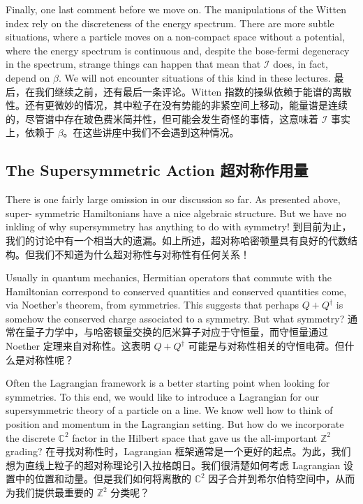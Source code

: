 \documentclass{article}
\newcommand{\SakuraiYukiko}{\emoji{cherry-blossom}\emoji{snowflake}}
\begin{document}
Finally, one last comment before we move on. The manipulations of the Witten index rely on the discreteness of the energy spectrum. There are more subtle situations, where a particle moves on a non-compact space without a potential, where the energy spectrum is continuous and, despite the bose-fermi degeneracy in the spectrum, strange things can happen that mean that $\mathcal{I}$ does, in fact, depend on $\beta$. We will not encounter situations of this kind in these lectures.
最后，在我们继续之前，还有最后一条评论。Witten 指数的操纵依赖于能谱的离散性。还有更微妙的情况，其中粒子在没有势能的非紧空间上移动，能量谱是连续的，尽管谱中存在玻色费米简并性，但可能会发生奇怪的事情，这意味着 $\mathcal{I}$ 事实上，依赖于 $\beta$。在这些讲座中我们不会遇到这种情况。

\subsection{The Supersymmetric Action \SakuraiYukiko 超对称作用量}

There is one fairly large omission in our discussion so far. As presented above, super- symmetric Hamiltonians have a nice algebraic structure. But we have no inkling of why supersymmetry has anything to do with symmetry!
到目前为止，我们的讨论中有一个相当大的遗漏。如上所述，超对称哈密顿量具有良好的代数结构。但我们不知道为什么超对称性与对称性有任何关系！

Usually in quantum mechanics, Hermitian operators that commute with the Hamiltonian correspond to conserved quantities and conserved quantities come, via Noether's theorem, from symmetries. This suggests that perhaps $Q + Q^{\dagger}$ is somehow the conserved charge associated to a symmetry. But what symmetry?
通常在量子力学中，与哈密顿量交换的厄米算子对应于守恒量，而守恒量通过 Noether 定理来自对称性。这表明 $Q + Q^{\dagger}$ 可能是与对称性相关的守恒电荷。但什么是对称性呢？

Often the Lagrangian framework is a better starting point when looking for symmetries. To this end, we would like to introduce a Lagrangian for our supersymmetric theory of a particle on a line. We know well how to think of position and momentum in the Lagrangian setting. But how do we incorporate the discrete $\mathbb{C}^2$ factor in the Hilbert space that gave us the all-important $\mathbb{Z}^2$ grading?
在寻找对称性时，Lagrangian 框架通常是一个更好的起点。为此，我们想为直线上粒子的超对称理论引入拉格朗日。我们很清楚如何考虑 Lagrangian 设置中的位置和动量。但是我们如何将离散的 $\mathbb{C}^2$ 因子合并到希尔伯特空间中，从而为我们提供最重要的 $\mathbb{Z}^2$ 分类呢？
\end{document}
